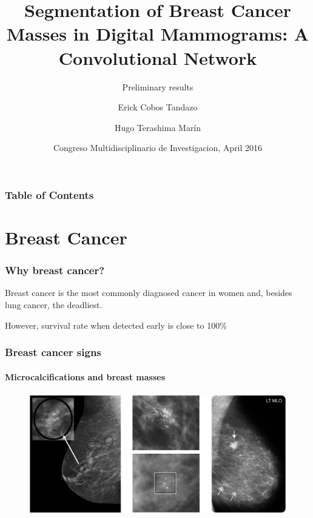 \documentclass[12pt]{beamer}
\title[Convolutional Networks for Breast Cancer]{Segmentation of Breast Cancer Masses in Digital Mammograms: A
Convolutional Network}
\subtitle{Preliminary results}
\author[Cobos, Terashima] {Erick Cobos Tandazo\inst{1} \and Hugo Terashima Marín\inst{1}}
\date[April 2016]{Congreso Multidisciplinario de Investigacion, April 2016}
\institute[Tecnológico de Monterrey]{
	\inst{1} Sistemas Inteligentes \\ Instituto Tecnológico de Monterrey
}
\begin{document}
	\begin{frame}
		\titlepage
	\end{frame}
	
	\begin{frame}
		\frametitle{Table of Contents}
		\tableofcontents
	\end{frame}

	\section{Breast Cancer}
	\begin{frame}
		\frametitle{Why breast cancer?}
		
		Breast cancer is the most commonly diagnosed cancer in women and, besides lung cancer, the deadliest.
	
		However, survival rate when detected early is close to 100\%
	\end{frame}
	
	
	
	\begin{frame}
		\frametitle{Breast cancer signs}
		\framesubtitle{Microcalcifications and breast masses}
		
		\begin{figure}
			\centering
			\includegraphics[width = \textwidth]{plots/signs.png}
		\end{figure}
		
	\end{frame}
	
\end{document}
